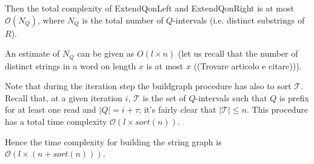 \documentclass[runningheads,envcountsame,a4paper]{llncs}
\begin{document}
Then the total  complexity of ExtendQonLeft and ExtendQonRight is at most $\mathcal{O}(N_Q)$, where $N_Q$ is the total number of $Q$-intervals (i.e. distinct substrings of $R$).

An estimate of $N_Q$ can be given as $O(l \times n)$ (let us recall that the number of distinct strings in a word on length $x$ is  at most $x$  ((Trovare articolo e citare))).

Note that during the iteration step the buildgraph procedure has also to sort $\mathcal{T}$. Recall that, at a given iteration $i$, $\mathcal{T}$ is the set of $Q$-intervals such that $Q$ is prefix for at least one read and $|Q| = i + \tau$; it's fairly clear that $|\mathcal{T}| \leq n$. This procedure has a total time complexity $\mathcal{O}(l \times sort(n))$.

Hence the time complexity for building the string graph is $\mathcal{O}(l \times (n + sort(n)))$. %



\end{document}
